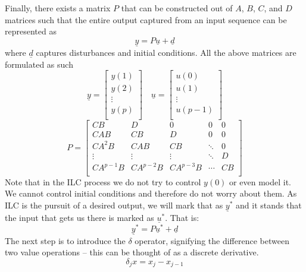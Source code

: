 Finally, there exists a matrix $P$ that can be constructed out of $A$, $B$, $C$, and $D$ matrices such that the entire output captured from an input sequence can be represented as 
\begin{equation}
    \underline{y}=P\underline{u}+\underline{d}
    \label{eq:y_Pu_d}
\end{equation}
where $\underline{d}$ captures disturbances and initial conditions. All the above matrices are formulated as such
\begin{equation}
    \underline{y}=\left[\begin{matrix}y\left(1\right)\\y\left(2\right)\\\vdots\\y\left(p\right)\\\end{matrix}\right]
    \quad
    \underline{u}=\left[\begin{matrix}u\left(0\right)\\u\left(1\right)\\\vdots\\u\left(p-1\right)\\\end{matrix}\right]
    \label{eq:y_u_stacks}
\end{equation}
\begin{equation}
    P=\left[\begin{matrix}CB&D&0&0&0\\CAB&CB&D&0&0\\CA^2B&CAB&CB&\ddots&0\\\vdots&\vdots&\vdots&\ddots&D\\CA^{p-1}B&CA^{p-2}B&CA^{p-3}B&\cdots&CB\\\end{matrix}\right]
    \label{ILC_P}
\end{equation}
Note that in the ILC process we do not try to control $y\left(0\right)$ or even model it. We cannot control initial conditions and therefore do not worry about them.
As ILC is the pursuit of a desired output, we will mark that as ${\underline{y}}^ \ast $ and it stands that the input that gets us there is marked as ${\underline{u}}^ \ast $. That is:
\begin{equation}
    {\underline{y}}^\ast=P{\underline{u}}^\ast+\underline{d}
    \label{eq:y*_Pu*_d}
\end{equation}
The next step is to introduce the $\delta$ operator, signifying the difference between two value operations -- this can be thought of as a discrete derivative.
\begin{equation}
    \delta_j x=x_j-x_{j-1}
    \label{eq:delta_operator}
\end{equation}

